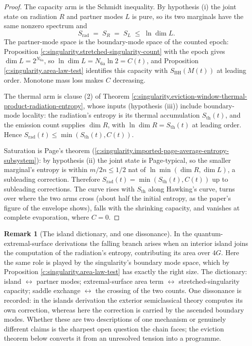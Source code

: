 \documentclass[11pt]{article}
\theoremstyle{definition}
\newtheorem{remark}[theorem]{Remark}
\theoremstyle{plain}
\providecommand{\Sth}{}\renewcommand{\Sth}{S_{\mathrm{th}}}
\begin{document}
\begin{proof}
The capacity arm is the Schmidt inequality. By hypothesis (i) the joint state on radiation $R$ and partner modes $L$ is pure, so its two marginals have the same nonzero spectrum and
\[
S_{\mathrm{rad}} \;=\; S_R \;=\; S_L \;\leq\; \ln\dim L .
\]
The partner-mode space is the boundary-mode space of the counted epoch: Proposition \ref{c:singularity.stretched-singularity-count} with the epoch gives $\dim L = 2^{N_{\mathrm{6a}}}$, so $\ln\dim L = N_{\mathrm{6a}}\ln 2 = C(t)$, and Proposition \ref{c:singularity.area-law-test} identifies this capacity with $S_{\mathrm{BH}}(M(t))$ at leading order. Monotone mass loss makes $C$ decreasing.

The thermal arm is clause (2) of Theorem \ref{c:singularity.eviction-window-thermal-product-radiation-entropy}, whose inputs (hypothesis (iii)) include boundary-mode locality: the radiation's entropy is its thermal accumulation $\Sth(t)$, and the emission count supplies $\dim R$, with $\ln\dim R = \Sth(t)$ at leading order. Hence $S_{\mathrm{rad}}(t) \leq \min(\Sth(t), C(t))$.

Saturation is Page's theorem (\ref{c:singularity.imported-page-average-entropy-subsystem}): by hypothesis (ii) the joint state is Page-typical, so the smaller marginal's entropy is within $m/2n \leq 1/2$ nat of $\ln\min(\dim R, \dim L)$, a subleading correction. Therefore $S_{\mathrm{rad}}(t) = \min(\Sth(t), C(t))$ up to subleading corrections. The curve rises with $\Sth$ along Hawking's curve, turns over where the two arms cross (about half the initial entropy, as the paper's figure of the envelope shows), falls with the shrinking capacity, and vanishes at complete evaporation, where $C = 0$.

\end{proof}

\begin{remark}[The island dictionary, and one dissonance]\label{c:note.singularity.island-dictionary-one-dissonance}
In the quantum-extremal-surface derivations \cite{Penington2020, AEMM2019} the falling branch arises when an interior island joins the computation of the radiation's entropy, contributing its area over $4G$. Here the same role is played by the singularity's boundary mode space, which by Proposition \ref{c:singularity.area-law-test} has exactly the right size. The dictionary: island $\leftrightarrow$ partner modes; extremal-surface area term $\leftrightarrow$ stretched-singularity capacity; saddle exchange $\leftrightarrow$ the crossing of the two counts. One dissonance is recorded: in the islands derivation the exterior semiclassical theory computes its own correction, whereas here the correction is carried by the ascended boundary modes. Whether these are two descriptions of one mechanism or genuinely different claims is the sharpest open question the chain faces; the eviction theorem below converts it from an unresolved tension into a programme.
\end{remark}
\end{document}
